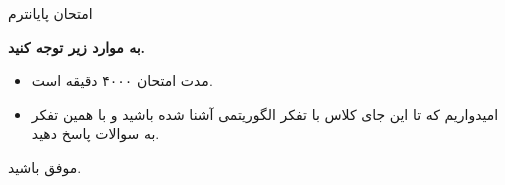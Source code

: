 
\usepackage{template/template}
\usepackage{tabularx}
\usepackage{graphicx}
\graphicspath{ {./images/} }


	\def\ci{\perp\!\!\!\perp}

	

	\header
		{امتحان پایانترم}{}{}{}{}
	

	
		\textbf{به موارد زیر توجه کنید.}
		
		\begin{itemize}
			\item مدت امتحان ۴۰۰۰ دقیقه است.
			\item امیدواریم که تا این جای کلاس با تفکر الگوریتمی آشنا شده باشید و با همین تفکر به سوالات پاسخ دهید.
		\end{itemize}
		
	\begin{enumerate}
		\setlength{\itemsep}{30pt}

		\end{enumerate}
	\begin{flushleft}
			موفق باشید. 
	\end{flushleft}

